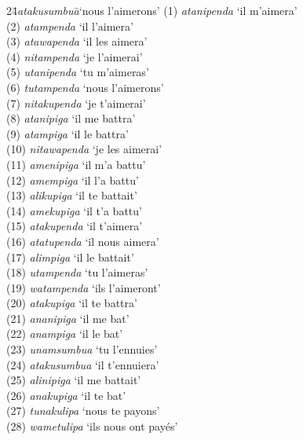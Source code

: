{    \begin{tabbing}
    24\hspace{2\tabcolsep}\=\hspace{2\tabcolsep}\textit{atakusumbua}\hspace{2\tabcolsep}\=\hspace{2\tabcolsep}‘nous l’aimerons’\kill
    (1)  \> \textit{atanipenda}   \> ‘il m’aimera’\\
    (2)  \> \textit{atampenda}    \> ‘il l’aimera’\\
    (3)  \> \textit{atawapenda}   \> ‘il les aimera’\\
    (4)  \> \textit{nitampenda}   \> ‘je l’aimerai’\\
    (5)  \> \textit{utanipenda}   \> ‘tu m’aimeras’\\
    (6)  \> \textit{tutampenda}   \> ‘nous l’aimerons’\\
    (7)  \> \textit{nitakupenda}  \> ‘je t’aimerai’\\
    (8)  \> \textit{atanipiga}    \> ‘il me battra’\\
    (9)  \> \textit{atampiga}     \> ‘il le battra’\\
    (10) \> \textit{nitawapenda}  \> ‘je les aimerai’\\
    (11) \> \textit{amenipiga}    \> ‘il m’a battu’\\
    (12) \> \textit{amempiga}     \> ‘il l’a battu’\\
    (13) \> \textit{alikupiga}    \> ‘il te battait’\\
    (14) \> \textit{amekupiga}    \> ‘il t’a battu’\\
    (15) \> \textit{atakupenda}   \> ‘il t’aimera’\\
    (16) \> \textit{atatupenda}   \> ‘il nous aimera’\\
    (17) \> \textit{alimpiga}     \> ‘il le battait’\\
    (18) \> \textit{utampenda}    \> ‘tu l’aimeras’\\
    (19) \> \textit{watampenda}   \> ‘ils l’aimeront’\\
    (20) \> \textit{atakupiga}    \> ‘il te battra’\\
    (21) \> \textit{ananipiga}    \> ‘il me bat’\\
    (22) \> \textit{anampiga}     \> ‘il le bat’\\
    (23) \> \textit{unamsumbua}   \> ‘tu l’ennuies’\\
    (24) \> \textit{atakusumbua}  \> ‘il t’ennuiera’\\
    (25) \> \textit{alinipiga}    \> ‘il me battait’\\
    (26) \> \textit{anakupiga}    \> ‘il te bat’\\
    (27) \> \textit{tunakulipa}   \> ‘nous te payons’\\
    (28) \> \textit{wametulipa}   \> ‘ils nous ont payés’
    \end{tabbing}

}
